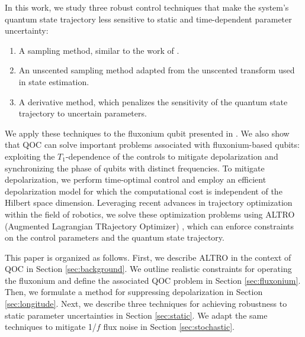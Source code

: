 In this work, we study three robust control techniques that
make the system's quantum state trajectory less sensitive
to static and time-dependent parameter uncertainty:
\begin{enumerate}
\item A sampling method, similar to the work of \cite{allen2019robust,
  ball2020software, carvalho2020error, khaneja2005optimal,
  reinhold2019controlling, rembold2020introduction}.
\item An unscented sampling method \cite{howell2020direct, lee2013sigma, thangavel2020robust}
  adapted from the unscented transform \cite{julier2004unscented,
    uhlmann1995dynamic} used in state estimation.
  \item A derivative method, which penalizes the sensitivity of the quantum state trajectory
    to uncertain parameters.
\end{enumerate}
We apply these techniques to the fluxonium qubit presented in \cite{zhang2020universal}.
We also show that QOC can solve important problems associated with
fluxonium-based qubits: exploiting the $T_{1}$-dependence of the controls
to mitigate depolarization
and synchronizing the phase of qubits with distinct frequencies.
To mitigate depolarization,
we perform time-optimal control and
employ an efficient depolarization model
for which the computational cost is independent of the
Hilbert space dimension.
Leveraging recent advances in trajectory optimization within the field of robotics, we
solve these optimization problems using ALTRO (Augmented Lagrangian TRajectory Optimizer)
\cite{howell2019altro}, which can enforce constraints on
the control parameters and the quantum state trajectory.

This paper is organized as follows.
First, we describe ALTRO in the context of QOC
in Section \ref{sec:background}.
We outline realistic constraints for operating the fluxonium and
define the associated QOC problem in Section \ref{sec:fluxonium}.
Then, we formulate a method for suppressing depolarization
in Section \ref{sec:longitude}. Next, we describe three techniques for achieving
robustness to static parameter uncertainties in Section \ref{sec:static}. We
adapt the same techniques to mitigate 1/$f$ flux noise
in Section \ref{sec:stochastic}.

